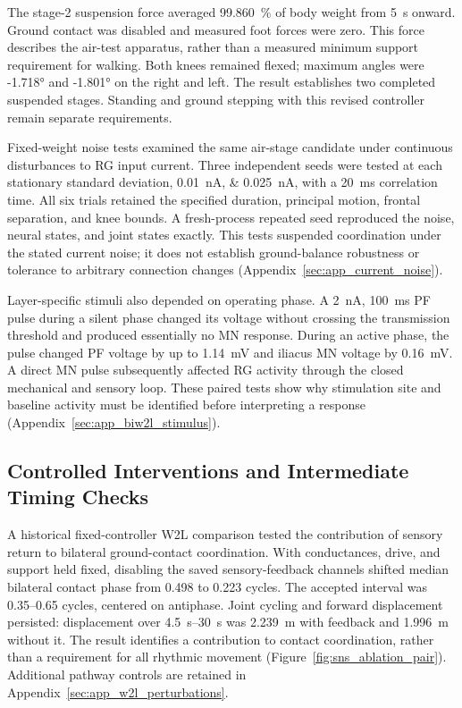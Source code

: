 The stage-2 suspension force averaged \qty{99.860}{\percent} of body weight from \qty{5}{\second} onward. Ground contact was disabled and measured foot forces were zero. This force describes the air-test apparatus, rather than a measured minimum support requirement for walking. Both knees remained flexed; maximum angles were \ang{-1.718} and \ang{-1.801} on the right and left. The result establishes two completed suspended stages. Standing and ground stepping with this revised controller remain separate requirements.

Fixed-weight noise tests examined the same air-stage candidate under continuous disturbances to RG input current. Three independent seeds were tested at each stationary standard deviation, \qtylist{0.01;0.025}{\nano\ampere}, with a \qty{20}{\milli\second} correlation time. All six trials retained the specified duration, principal motion, frontal separation, and knee bounds. A fresh-process repeated seed reproduced the noise, neural states, and joint states exactly. This tests suspended coordination under the stated current noise; it does not establish ground-balance robustness or tolerance to arbitrary connection changes (Appendix~\ref{sec:app_current_noise}).

Layer-specific stimuli also depended on operating phase. A \qty{2}{\nano\ampere}, \qty{100}{\milli\second} PF pulse during a silent phase changed its voltage without crossing the transmission threshold and produced essentially no MN response. During an active phase, the pulse changed PF voltage by up to \qty{1.14}{\milli\volt} and iliacus MN voltage by \qty{0.16}{\milli\volt}. A direct MN pulse subsequently affected RG activity through the closed mechanical and sensory loop. These paired tests show why stimulation site and baseline activity must be identified before interpreting a response (Appendix~\ref{sec:app_biw2l_stimulus}).

\subsection{Controlled Interventions and Intermediate Timing Checks}\label{sec:sns_feedback_test}\label{sec:sns_literature_results}\label{sec:layer_stimulus_main}

A historical fixed-controller W2L comparison tested the contribution of sensory return to bilateral ground-contact coordination. With conductances, drive, and support held fixed, disabling the saved sensory-feedback channels shifted median bilateral contact phase from 0.498 to 0.223 cycles. The accepted interval was 0.35--0.65 cycles, centered on antiphase. Joint cycling and forward displacement persisted: displacement over \qtyrange{4.5}{30}{\second} was \qty{2.239}{\meter} with feedback and \qty{1.996}{\meter} without it. The result identifies a contribution to contact coordination, rather than a requirement for all rhythmic movement (Figure~\ref{fig:sns_ablation_pair}). Additional pathway controls are retained in Appendix~\ref{sec:app_w2l_perturbations}.

